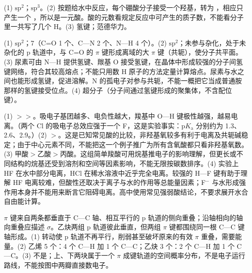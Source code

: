 \begin{jiexilist}
\item (1) $\mathrm{sp}^2$；$\mathrm{sp}^3$。(2) 按题给水中反应，每个硼酸分子接受一个羟基，转为 \ce{[B(OH)4]-}，相应只产生一个 ，所以是一元酸。酸的元数看规定反应中可产生的质子数，不能看分子里一共写了几个 H。(3) 氢键；范德华力。
\item (1) $\mathrm{sp}^2$；7（C=O 1 个、C—N 2 个、N—H 4 个）。(2) $\mathrm{sp}^2$；未参与杂化，处于未杂化的 p 轨道中，与 C=O 的 $\pi$ 键形成离域的大 $\pi$ 键（共轭），使分子共平面。(3) 尿素可由 N—H 提供氢键、羰基 O 接受氢键，在晶体中形成较强的分子间氢键网络，符合其较高熔点；不能只用数 H 原子的方法定量计算熔点。尿素与水之间也能形成氢键，促进溶解。N 的孤电子对参与共轭，不能一概把它当成普通胺那样的氢键接受位点。(4) 超分子（分子间通过氢键形成的聚集体，不含配位键）。
\item (1) $>$$>$。吸电子基团越多、电负性越大，羧基中 O—H 键极性越强，越易电离。（两个 Cl 的吸电子总效应强于一个 F，这是实验事实：p$K_\text{a}$ 分别约为 1.3、2.6、2.9。）(2) $>$。这是已知常见酸的比较，非羟基氧较多有利于电离及共轭碱稳定；由于中心元素不同，不能把这一个例子推广为所有含氧酸都只看非羟基氧数。(3) 甲酸$>$乙酸$>$丙酸。这组简单羧酸可用烷基推电子的影响理解，但更长或不同结构的烷基还受到溶剂和空间等因素影响，不能无限按碳数排序。(4) 实验上 HF 在水中部分电离，HCl 在稀水溶液中近乎完全电离。较强的 H—F 键有助于理解 HF 电离较难，但酸性还取决于离子与水的作用等总能量因素；F$^-$ 与水形成强作用本身并不能用来断言它阻碍电离。高中使用常见强弱酸结论，不要求展开水合自由能计算。
\item $\pi$ 键来自两条都垂直于 C—C 轴、相互平行的 p 轨道的侧向重叠；沿轴相向的轴向重叠应描述 $\sigma$。乙炔两组 p 轨道彼此垂直，但两组 $\pi$ 键都围绕同一根 C—C 键轴形成。(1) 转动使 p 轨道不再平行，削弱甚至破坏原来的有效 $\pi$ 重叠，需要能量。(2) 乙烯 5 个：4 个 C—H 加 1 个 C—C；乙炔 3 个：2 个 C—H 加 1 个 C—C。(3) 不是；上、下两块属于一个 $\pi$ 成键轨道的空间概率分布，不是电子运行路线，不能按图中两瓣直接数电子。
\end{jiexilist}
